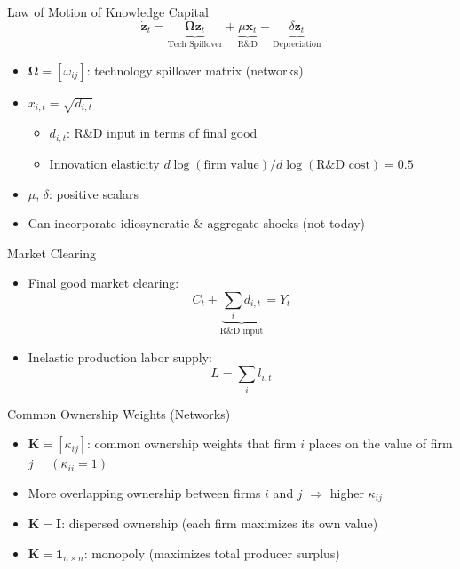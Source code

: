 \documentclass[
  10pt,
  aspectratio=169,   %
]{beamer}
\theoremstyle{plain}
\begin{document}
\begin{frame}{Law of Motion of Knowledge Capital}
  \[
    \dot{\bm{z}}_{t}=\underbrace{\bm{\Omega}\bm{z}_{t}}_{\text{Tech Spillover}}+\underbrace{\mu\bm{x}_{t}}_{\text{R\&D}}-\underbrace{\delta\bm{z}_{t}}_{\text{Depreciation}}
  \]
  \begin{itemize}
    \item \alert{$\bm{\Omega}=\left[\omega_{ij}\right]$: technology spillover matrix (networks)}\medskip{} \pause
    \item $x_{i,t}=\sqrt{d_{i,t}}$
          \begin{itemize}
            \item $d_{i,t}$: R\&D input in terms of final good
            \item Innovation elasticity $d\log\left(\text{firm value}\right)/d \log\left(\text{R\&D cost}\right) = 0.5$
          \end{itemize}
          \medskip{} \pause
    \item $\mu$, $\delta$: positive scalars
          \medskip{} \pause
    \item Can incorporate idiosyncratic \& aggregate shocks (not today)
  \end{itemize}
\end{frame}

\begin{frame}{Market Clearing}
  \begin{itemize}
    \item Final good market clearing:
          \[
            C_{t}+\underbrace{\sum_{i}d_{i,t}}_{\text{R\&D input}}=Y_{t}
          \]
          \pause
    \item Inelastic production labor supply:
          \[
            L=\sum_{i}l_{i,t}
          \]
  \end{itemize}
\end{frame}

\begin{frame}{Common Ownership Weights (Networks)}
  \label{ownership_weight}
  \begin{itemize}
    \item \alert{$\bm{K}=\left[\kappa_{ij}\right]$: common ownership weights that firm $i$ places on the value of firm $j$ $\quad (\kappa_{ii} = 1)$}
          \medskip{} \pause
    \item More overlapping ownership between firms $i$ and $j$ $\Longrightarrow$ higher $\kappa_{ij}$  \medskip{} \pause
    \item $\bm{K}=\bm{I}$: dispersed ownership (each firm maximizes its own value)
          \medskip{}
    \item $\bm{K}=\bm{1}_{n \times n}$: monopoly (maximizes total producer surplus)
  \end{itemize}
\end{frame}
\end{document}
